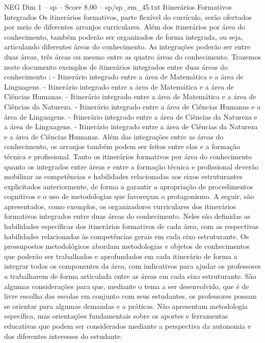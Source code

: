 \begin{textsample}{NEG Dim 1 – sp – Score 8.00 – sp/sp\_em\_45.txt}  \label{ex:f1_neg_180}
Itinerários Formativos Integrados Os itinerários formativos, parte flexível do currículo, serão ofertados por meio de diferentes arranjos curriculares.
Além dos itinerários por área do conhecimento, também poderão ser organizados de forma integrada, ou seja, articulando diferentes áreas do conhecimento.
As integrações poderão ser entre duas áreas, três áreas ou mesmo entre as quatro áreas do conhecimento.
Trazemos neste documento exemplos de itinerários integrados entre duas áreas do conhecimento : - Itinerário integrado entre a área de Matemática e a área de Linguagens. - Itinerário integrado entre a área de Matemática e a área de Ciências Humanas. - Itinerário integrado entre a área de Matemática e a área de Ciências da Natureza. - Itinerário integrado entre a área de Ciências Humanas e a área de Linguagens. - Itinerário integrado entre a área de Ciências da Natureza e a área de Linguagens. - Itinerário integrado entre a área de Ciências da Natureza e a área de Ciências Humanas.
Além das integrações entre as áreas do conhecimento, os arranjos também podem ser feitos entre elas e a formação técnica e profissional.
Tanto os itinerários formativos por área do conhecimento quanto os integrados entre áreas e entre a formação técnica e profissional deverão mobilizar as competências e habilidades relacionadas aos eixos estruturantes explicitados anteriormente, de forma a garantir a apropriação de procedimentos cognitivos e o uso de metodologias que favoreçam o protagonismo.
A seguir, são apresentados, como exemplos, os organizadores curriculares dos itinerários formativos integrados entre duas áreas do conhecimento.
Neles são definidas as habilidades específicas dos itinerários formativos de cada área, com as respectivas habilidades relacionadas às competências gerais em cada eixo estruturante.
Os pressupostos metodológicos abordam metodologias e objetos de conhecimentos que poderão ser trabalhados e aprofundados em cada itinerário de forma a integrar todos os componentes da área, com indicativos para ajudar os professores a trabalharem de forma articulada entre as áreas em cada eixo estruturante.
São algumas considerações para que, mediante o tema a ser desenvolvido, que é de livre escolha das escolas em conjunto com seus estudantes, os professores possam se orientar para algumas demandas e a práticas.
Não apresentam metodologia específica, mas orientações fundamentais sobre os aportes e ferramentas educativas que podem ser considerados mediante a perspectiva da autonomia e dos diferentes interesses do estudante.

\end{textsample}
